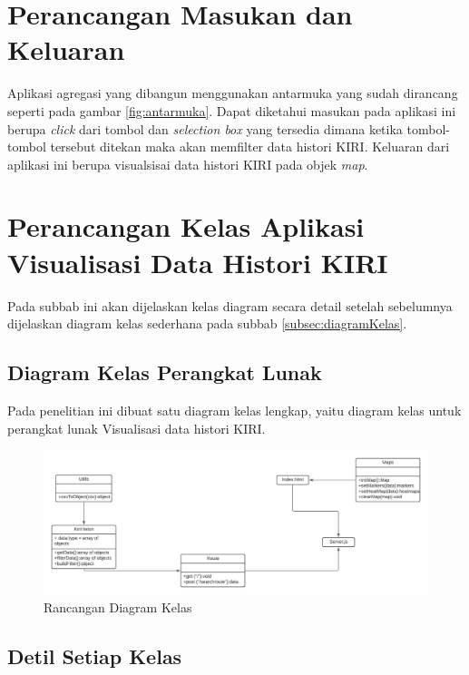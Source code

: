 \section{Perancangan Masukan dan Keluaran}
Aplikasi agregasi yang dibangun menggunakan antarmuka yang sudah dirancang seperti pada gambar \ref{fig:antarmuka}. Dapat diketahui masukan pada aplikasi ini berupa \textit{click} dari tombol dan \textit{selection box} yang tersedia dimana ketika tombol-tombol tersebut ditekan maka akan memfilter data histori KIRI. Keluaran dari aplikasi ini berupa visualsisai data histori KIRI pada objek \textit{map}.


\section{Perancangan Kelas Aplikasi Visualisasi Data Histori KIRI}
Pada subbab ini akan dijelaskan kelas diagram secara detail setelah sebelumnya dijelaskan diagram kelas sederhana pada subbab \ref{subsec:diagramKelas}. 

\subsection{Diagram Kelas Perangkat Lunak}
Pada penelitian ini dibuat satu diagram kelas lengkap, yaitu diagram kelas untuk perangkat lunak Visualisasi data histori KIRI.


\begin{figure}[H]
	\centering  
	\includegraphics[scale=0.5]{Gambar/ClassDiagramLengkap.jpeg}  
	\caption[Rancangan Diagram Kelas]{Rancangan Diagram Kelas} 
	\label{fig:diagramKelas} 
\end{figure}

\subsection{Detil Setiap Kelas}

